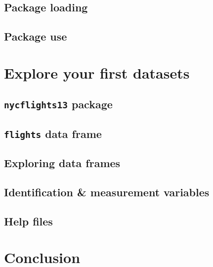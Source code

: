 \documentclass[12pt, krantz2,]{krantz}
\begin{document}
\hypertarget{package-loading}{%
\subsection{Package loading}\label{package-loading}}

\hypertarget{package-use}{%
\subsection{Package use}\label{package-use}}

\hypertarget{nycflights13}{%
\section{Explore your first datasets}\label{nycflights13}}

\hypertarget{nycflights13-package}{%
\subsection{\texorpdfstring{\texttt{nycflights13} package}{nycflights13 package}}\label{nycflights13-package}}

\hypertarget{flights-data-frame}{%
\subsection{\texorpdfstring{\texttt{flights} data frame}{flights data frame}}\label{flights-data-frame}}

\hypertarget{exploredataframes}{%
\subsection{Exploring data frames}\label{exploredataframes}}

\hypertarget{identification-vs-measurement-variables}{%
\subsection{Identification \& measurement variables}\label{identification-vs-measurement-variables}}

\hypertarget{help-files}{%
\subsection{Help files}\label{help-files}}

\hypertarget{conclusion}{%
\section{Conclusion}\label{conclusion}}
\end{document}

